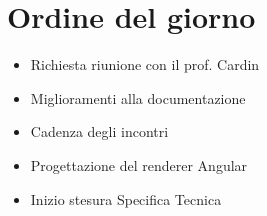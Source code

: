 \documentclass[a4paper,12pt]{article}
\begin{document}
    

    \newpage
    \tableofcontents
    \newpage

    \section{Ordine del giorno}
        \begin{itemize}
            \item Richiesta riunione con il prof. Cardin
            \item Miglioramenti alla documentazione 
            \item Cadenza degli incontri 
            \item Progettazione del renderer Angular
            \item Inizio stesura Specifica Tecnica
        \end{itemize}
\end{document}
